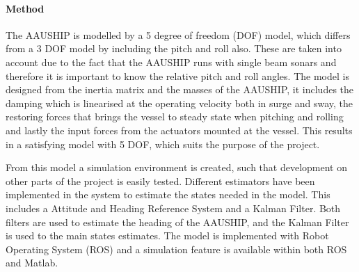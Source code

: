 \documentclass[a4paper,12pt]{article}
\begin{document}
\paragraph{Method}
The AAUSHIP is modelled by a 5 degree of freedom (DOF) model, which differs
from a 3 DOF model by including the pitch and roll also.
These are taken into account due to the fact that the AAUSHIP runs
with single beam sonars and therefore it is important to know the
relative pitch and roll angles. The model is designed from the inertia matrix and the masses of the AAUSHIP, it includes the damping which is linearised at the operating velocity both in surge and sway, the restoring forces that brings the vessel to steady state when pitching and rolling and lastly the input forces from the actuators mounted at the vessel. This results in a satisfying model with 5 DOF, which suits the purpose of the project.

From this model a simulation environment is created, such that
development on other parts of the project is easily tested.  Different
estimators have been implemented in the system to estimate the states
needed in the model. This includes a Attitude and Heading Reference
System and a Kalman Filter. Both filters are used to estimate the
heading of the AAUSHIP, and the Kalman Filter is used to the main
states estimates. The model is implemented with Robot Operating System
(ROS) and a simulation feature is available within both ROS and Matlab.

\end{document}
